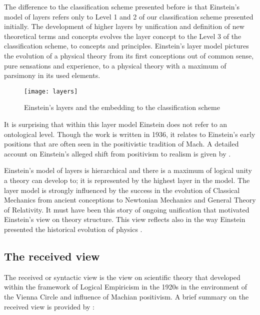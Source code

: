 \documentclass{article}
\begin{document}
The difference to the classification scheme presented before is that Einstein's model of layers refers only to Level 1 and 2 of our classification scheme  presented initially. The development of higher layers by unification and definition of new theoretical terms and concepts evolves the layer concept to the Level 3 of the classification scheme, to concepts and principles. Einstein's layer model pictures the evolution of a physical theory from its first conceptions out of common sense, pure sensations and experience, to a physical theory with a maximum of parsimony in its used elements. \newline

\begin{figure}[h]
\centering

\texttt{[image: layers]}

\caption{Einstein's layers and the embedding to the classification scheme}
\end{figure}

It is surprising that within this layer model Einstein does not refer to an ontological level. Though the work is written in 1936, it relates to Einstein's early positions that are often seen in the positivistic tradition of Mach. A detailed account on Einstein's alleged shift from positivism to realism is given by \cite[]{howard1993einstein}.  \newline

\newpage

Einstein's model of layers is hierarchical and there is a maximum of logical unity a theory can develop to; it is represented by the highest layer in the model. The layer model is strongly influenced by the success in the evolution of Classical Mechanics from ancient conceptions to Newtonian Mechanics and General Theory of Relativity. It must have been this story of ongoing unification that motivated Einstein's view on theory structure. \newline
This view reflects also in the way Einstein presented the historical evolution of physics \cite[]{einstein1950evolution}.

\newpage

\subsection{The received view}

The received or syntactic view is the view on scientific theory that developed within the framework of Logical Empiricism in the 1920s in the environment of the Vienna Circle and influence of Machian positivism. A brief summary on the received view is provided by \cite[p.12]{suppe1977structure}:  
\end{document}
